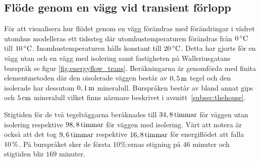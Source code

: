 \subsection{Flöde genom en vägg vid transient förlopp}


För att visualisera hur flödet genom en vägg förändras med
förändringar i vädret utomhus modelleras ett tidssteg där utomhustemperaturen förändras från
$\unit[0]{^\circ C}$ till $\unit[10]{^\circ C}$. Inomhustemperaturen hålls konstant till $\unit[20]{^\circ C}$.
Detta har gjorts för en vägg utan och en vägg med isolering samt fastigheten på Walleriusgatans burspråk
se figur \ref{fig:energyflow_trans}. Beräkningarna är genomförda med finita elementmetoden
där den oisolerade väggen består av $\unit[0,5]{m}$ tegel och den isolerade har dessutom $\unit[0,1]{m}$ mineralull. Burspråken
består av bland annat gips och $\unit[5]{cm}$ mineralull vilket finns närmare beskrivet i avsnitt~\ref{subsec:thehouse}.

Stigtiden för de två tegelväggarna beräknades till $\unit[34,8]{timmar}$ för väggen utan isolering
respektive $\unit[98,8]{timmar}$ för väggen med isolering. 
Värt att notera är också att det tog $\unit[9,6]{timmar}$ respektive $\unit[16,8]{timmar}$ för energiflödet att falla $\unit[10]{\%}$. 
På burspråket sker de första 10\%:ernas stigning på $46$ minuter och stigtiden blir $169$ minuter.

